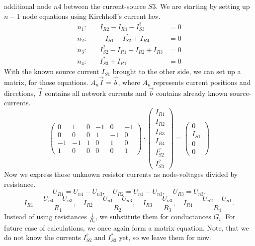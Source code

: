 {additional node $n4$ between the current-source $S3$. We are starting by setting up 
$n-1$ node equations using Kirchhoff's current law.
\begin{align*}
   n_1: \quad&I_{R2}-I_{R4}-I_{S3}^? &= 0 \\
   n_2: \quad&-I_{S1} - I_{S2}^? + I_{R4} &= 0 \\
   n_3: \quad&I_{S2}^? - I_{R1} - I_{R2} + I_{R3} &= 0 \\
   n_4: \quad&I_{S3}^? + I_{R1} &= 0
\end{align*}
With the known source current $I_{S1}$ brought to the other side, we can set up a matrix, for those
equations. $A_n\vec{I} = \vec{b}$, where $A_n$ represents current positions and directions,
$\vec{I}$ contains all network currents and  $\vec{b}$ contains already known source-currents.
\begin{equation}
   \begin{pmatrix}
      0 & 1 & 0 & -1 & 0 & -1 \\
      0 & 0 & 0 & 1 & -1 & 0  \\
      -1 & -1 & 1 & 0 & 1 & 0 \\
      1 & 0 & 0 & 0 & 0 & 1  
   \end{pmatrix}
   \cdot
   \begin{pmatrix}
       I_{R1} \\ I_{R2} \\ I_{R3} \\ I_{R4} \\ I_{S2}^? \\ I_{S3}^? 
   \end{pmatrix}
   =
   \begin{pmatrix}
      0 \\ I_{S1} \\ 0 \\ 0  
   \end{pmatrix}
   \label{eqn:nodes}
\end{equation}
Now we express those unknown resistor currents as node-voltages divided by resistance.
\[
   U_{R1} = U_{n4} - U_{n3}, \quad U_{R2} = U_{n1} - U_{n3}, \quad U_{R3} = U_{n3}
.\] 
\[
   I_{R1} = \frac{U_{n4} - U_{n3}}{R_1}, \quad I_{R2} = \frac{U_{n1} - U_{n3}}{R_2}, \quad
   I_{R3} = \frac{U_{n3}}{R_3}, \quad I_{R4} = \frac{U_{n2} - U_{n1}}{R_4} 
.\]
\newpage
Instead of using resistances $\frac{1}{R_i}$,  we substitute them for conductances
$G_{i}$. For future ease of calculations, we once again form a matrix equation. Note, that we do not know
the currents $I_{S2}^?$ and $I_{S3}^?$ yet, so we leave them for now.
}
